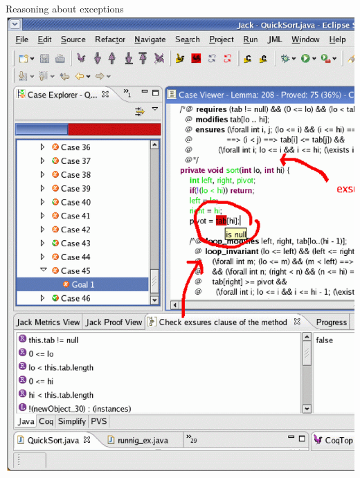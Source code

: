 \documentclass[final,nocolorBG,a4,mobius,nototal,pdf,slideColor]{prosper}
\begin{document}
\begin{slide}{Reasoning about exceptions}
\vspace*{-1.5em}
\includegraphics[height=\textheight]{screen5.ps}
\end{slide}
\end{document}
